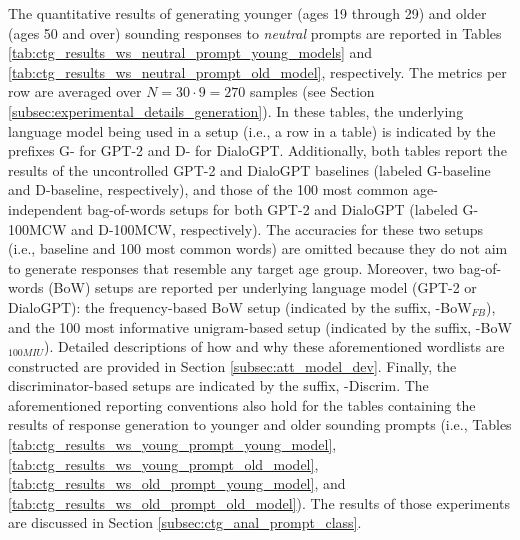 
The quantitative results of generating younger (ages 19 through 29) and older (ages 50 and over) sounding responses to \textit{neutral} prompts are reported in Tables \ref{tab:ctg_results_ws_neutral_prompt_young_models} and \ref{tab:ctg_results_ws_neutral_prompt_old_model}, respectively. The metrics per row are averaged over $N = 30 \cdot 9 = 270$ samples (see Section \ref{subsec:experimental_details_generation}). In these tables, the underlying language model being used in a setup (i.e., a row in a table) is indicated by the prefixes G- for GPT-2 and D- for DialoGPT. Additionally, both tables report the results of the uncontrolled GPT-2 and DialoGPT baselines (labeled G-baseline and D-baseline, respectively), and those of the 100 most common age-independent bag-of-words setups for both GPT-2 and DialoGPT (labeled G-100MCW and D-100MCW, respectively). The accuracies for these two setups (i.e., baseline and 100 most common words) are omitted because they do not aim to generate responses that resemble any target age group. Moreover, two bag-of-words (BoW) setups are reported per underlying language model (GPT-2 or DialoGPT): the frequency-based BoW setup (indicated by the suffix, -BoW$_{FB}$), and the 100 most informative unigram-based setup (indicated by the suffix, -BoW$_{100MIU}$). Detailed descriptions of how and why these aforementioned wordlists are constructed are provided in Section \ref{subsec:att_model_dev}. Finally, the discriminator-based setups are indicated by the suffix, -Discrim. The aforementioned reporting conventions also hold for the tables containing the results of response generation to younger and older sounding prompts (i.e., Tables \ref{tab:ctg_results_ws_young_prompt_young_model}, \ref{tab:ctg_results_ws_young_prompt_old_model}, \ref{tab:ctg_results_ws_old_prompt_young_model}, and \ref{tab:ctg_results_ws_old_prompt_old_model}). The results of those experiments are discussed in Section \ref{subsec:ctg_anal_prompt_class}.

